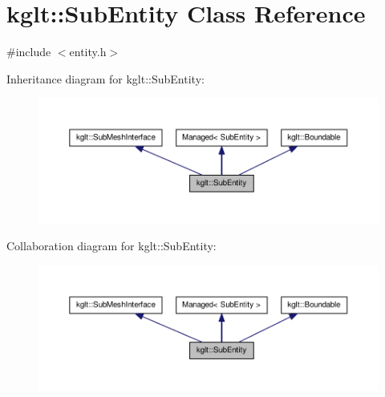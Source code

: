 \hypertarget{classkglt_1_1_sub_entity}{\section{kglt\-:\-:Sub\-Entity Class Reference}
\label{classkglt_1_1_sub_entity}
}


{\ttfamily \#include $<$entity.\-h$>$}



Inheritance diagram for kglt\-:\-:Sub\-Entity\-:\nopagebreak
\begin{figure}[H]
\begin{center}
\leavevmode
\includegraphics[width=350pt]{classkglt_1_1_sub_entity__inherit__graph}
\end{center}
\end{figure}


Collaboration diagram for kglt\-:\-:Sub\-Entity\-:\nopagebreak
\begin{figure}[H]
\begin{center}
\leavevmode
\includegraphics[width=350pt]{classkglt_1_1_sub_entity__coll__graph}
\end{center}
\end{figure}
